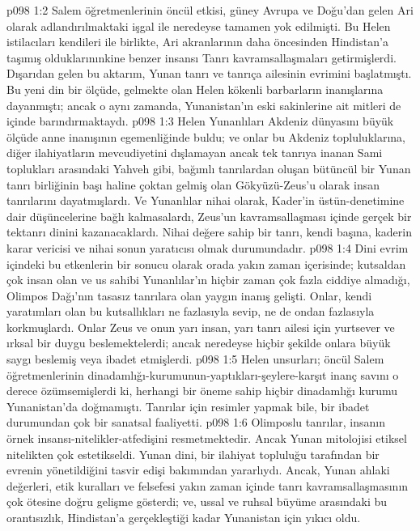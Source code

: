 \vs p098 1:2 Salem öğretmenlerinin öncül etkisi, güney Avrupa ve Doğu’dan gelen Ari olarak adlandırılmaktaki işgal ile neredeyse tamamen yok edilmişti. Bu Helen istilacıları kendileri ile birlikte, Ari akranlarının daha öncesinden Hindistan’a taşımış olduklarınınkine benzer insansı Tanrı kavramsallaşmaları getirmişlerdi. Dışarıdan gelen bu aktarım, Yunan tanrı ve tanrıça ailesinin evrimini başlatmıştı. Bu yeni din bir ölçüde, gelmekte olan Helen kökenli barbarların inanışlarına dayanmıştı; ancak o aynı zamanda, Yunanistan’ın eski sakinlerine ait mitleri de içinde barındırmaktaydı.
\vs p098 1:3 Helen Yunanlıları Akdeniz dünyasını büyük ölçüde anne inanışının egemenliğinde buldu; ve onlar bu Akdeniz topluluklarına, diğer ilahiyatların mevcudiyetini dışlamayan ancak tek tanrıya inanan Sami toplukları arasındaki Yahveh gibi, bağımlı tanrılardan oluşan bütüncül bir Yunan tanrı birliğinin başı haline çoktan gelmiş olan Gökyüzü\hyp{}Zeus’u olarak insan tanrılarını dayatmışlardı. Ve Yunanlılar nihai olarak, Kader’in üstün\hyp{}denetimine dair düşüncelerine bağlı kalmasalardı, Zeus’un kavramsallaşması içinde gerçek bir tektanrı dinini kazanacaklardı. Nihai değere sahip bir tanrı, kendi başına, kaderin karar vericisi ve nihai sonun yaratıcısı olmak durumundadır.
\vs p098 1:4 Dini evrim içindeki bu etkenlerin bir sonucu olarak orada yakın zaman içerisinde; kutsaldan çok insan olan ve us sahibi Yunanlılar’ın hiçbir zaman çok fazla ciddiye almadığı, Olimpos Dağı’nın tasasız tanrılara olan yaygın inanış gelişti. Onlar, kendi yaratımları olan bu kutsallıkları ne fazlasıyla sevip, ne de ondan fazlasıyla korkmuşlardı. Onlar Zeus ve onun yarı insan, yarı tanrı ailesi için yurtsever ve ırksal bir duygu beslemektelerdi; ancak neredeyse hiçbir şekilde onlara büyük saygı beslemiş veya ibadet etmişlerdi.
\vs p098 1:5 Helen unsurları; öncül Salem öğretmenlerinin dinadamlığı\hyp{}kurumunun\hyp{}yaptıkları\hyp{}şeylere\hyp{}karşıt inanç savını o derece özümsemişlerdi ki, herhangi bir öneme sahip hiçbir dinadamlığı kurumu Yunanistan’da doğmamıştı. Tanrılar için resimler yapmak bile, bir ibadet durumundan çok bir sanatsal faaliyetti.
\vs p098 1:6 Olimposlu tanrılar, insanın örnek insansı\hyp{}nitelikler\hyp{}atfedişini resmetmektedir. Ancak Yunan mitolojisi etiksel nitelikten çok estetikseldi. Yunan dini, bir ilahiyat topluluğu tarafından bir evrenin yönetildiğini tasvir edişi bakımından yararlıydı. Ancak, Yunan ahlaki değerleri, etik kuralları ve felsefesi yakın zaman içinde tanrı kavramsallaşmasının çok ötesine doğru gelişme gösterdi; ve, ussal ve ruhsal büyüme arasındaki bu orantısızlık, Hindistan’a gerçekleştiği kadar Yunanistan için yıkıcı oldu.
